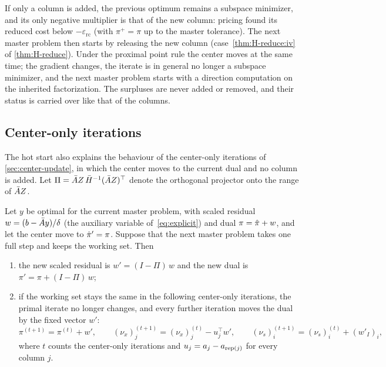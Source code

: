 If only a column is added, the previous optimum remains a subspace minimizer, and its only
negative multiplier is that of the new column: pricing found its reduced cost below
$-\varepsilon_{\mathrm{rc}}$ (with $\pi^+ = \pi$ up to the master tolerance). The next master
problem then starts by releasing the new column (case~\ref{thm:H-reduce:iv} of \cref{thm:H-reduce}). Under the
proximal point rule the center moves at the same time; the gradient changes, the iterate is in
general no longer a subspace minimizer, and the next master problem starts with a direction
computation on the inherited factorization. The surpluses are never added or
removed, and their status is carried over like that of the columns.

\subsection{Center-only iterations}

The hot start also explains the behaviour of the center-only iterations of
\cref{sec:center-update}, in which the center moves to the current dual and no column is
added. Let $\Pi = \bar{A} Z\,\bar{H}^{-1}(\bar{A} Z)^\top$ denote the orthogonal projector onto the range
of $\bar{A} Z$.

\begin{prop} \label{prop:center-only}
Let $y$ be optimal for the current master problem, with scaled residual
$w = (b - \bar{A} y)/\delta$ (the auxiliary variable of~\eqref{eq:explicit}) and dual
$\pi = \hat{\pi} + w$, and let the center move to $\hat{\pi}' = \pi$. Suppose that the next
master problem takes one full step and keeps the working set. Then
\begin{enumerate}
    \item \label{prop:center-only:i} the new scaled residual is $w' = (I-\Pi)\,w$ and the new dual is $\pi' = \pi + (I-\Pi)\,w$;
    \item \label{prop:center-only:ii} if the working set stays the same in the following center-only iterations, the
          primal iterate no longer changes, and every further iteration moves the dual by the
          fixed vector $w'$:
          \[
          \pi^{(t+1)} = \pi^{(t)} + w',\qquad
          (\nu_x)_j^{(t+1)} = (\nu_x)_j^{(t)} - u_j^\top w',\qquad
          (\nu_s)_i^{(t+1)} = (\nu_s)_i^{(t)} + (w'_I)_i,
          \]
          where $t$ counts the center-only iterations and $u_j = a_j - a_{\operatorname{rep}(j)}$ for every
          column $j$.
\end{enumerate}
\end{prop}

